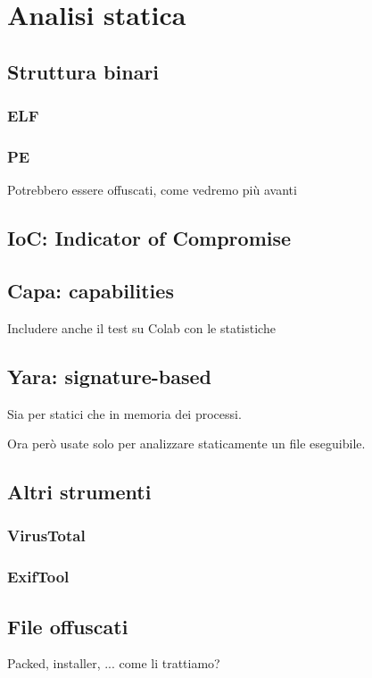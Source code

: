 \chapter{Analisi statica}

\section{Struttura binari}

\subsection{ELF}

\subsection{PE}
Potrebbero essere offuscati, come vedremo più avanti

\section{IoC: Indicator of Compromise}

\section{Capa: capabilities}
Includere anche il test su Colab con le statistiche

\section{Yara: signature-based}
Sia per statici che in memoria dei processi.

Ora però usate solo per analizzare staticamente un file eseguibile.

\section{Altri strumenti}
\subsection{VirusTotal}
\subsection{ExifTool}

\section{File offuscati}
Packed, installer, ... come li trattiamo?


